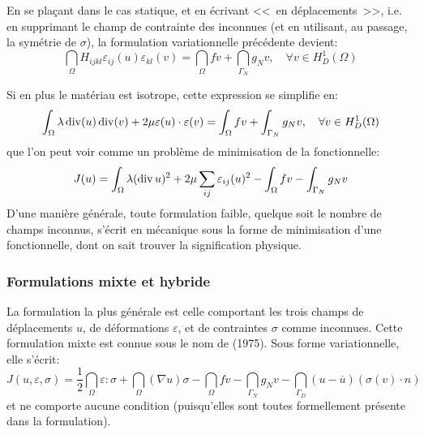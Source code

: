 En se plaçant dans le cas statique, et en écrivant <<~en déplacements~>>, i.e.
en supprimant le champ de contrainte des inconnues  (et en utilisant, au passage,
la symétrie de $\sigma$), la formulation variationnelle précédente devient:
\begin{equation}
\dint_\Omega H_{ijkl}\varepsilon_{ij}(u)\varepsilon_{kl}(v) = \dint_\Omega fv +
\dint_{\Gamma_N} g_N v, \quad \forall v\in H^1_D(\Omega)
\end{equation}

\medskip
Si en plus le matériau est isotrope, cette expression se simplifie en:
\begin{equation}
\displaystyle\int_\Omega \lambda \operatorname{div}(u)\operatorname{div}(v)+2\mu\varepsilon(u)\cdot\varepsilon(v) = \displaystyle\int_\Omega fv +
\displaystyle\int_{\Gamma_N} g_N v, \quad \forall v\in H^1_D(\Omega)
\end{equation}
que l'on peut voir comme un problème de minimisation de la fonctionnelle:
\begin{equation}
J(u)=
\displaystyle\int_\Omega \lambda (\operatorname{div} u)^2+2\mu\displaystyle\sum_{ij}\varepsilon_{ij}(u)^2 - \displaystyle\int_\Omega fv -
\displaystyle\int_{\Gamma_N} g_N v
\end{equation}
\medskip
D'une manière générale, toute formulation faible, quelque soit le nombre
de champs inconnus, s'écrit en mécanique sous la forme de minimisation d'une
fonctionnelle, dont on sait trouver la signification physique.

\medskip
\subsubsection{Formulations mixte et hybride}\label{Sec-MH}
La formulation la plus générale est celle comportant les trois champs de déplacements
$u$, de déformations $\varepsilon$, et de contraintes $\sigma$ comme inconnues.
Cette formulation mixte est connue sous le nom de  (1975).
Sous forme variationnelle, elle s'écrit:
\begin{equation}
J(u,\varepsilon,\sigma) =
\frac12 \dint_\Omega \varepsilon :\sigma
+\dint_\Omega (\nabla u) \sigma
- \dint_\Omega f v
- \dint_{\Gamma_N} g_N v
- \dint_{\Gamma_D}  (u-\overline{u}) (\sigma(v)\cdot n)
\end{equation}
et ne comporte aucune condition (puisqu'elles sont toutes formellement présente dans
la formulation).

